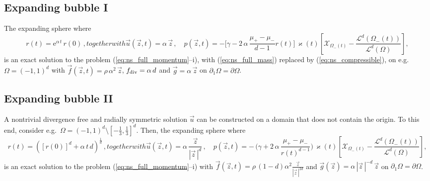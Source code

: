 \documentclass[a4paper,12pt,onecolumn]{article}
\newcommand{\vol}{\mathcal{L}^d}
\newcommand{\bigchi}{\ensuremath{\mathrm{\mathcal{X}}}}
\newcommand{\charfcn}[1]{\bigchi_{#1}} %
\begin{document}
\subsection{Expanding bubble I}\label{sec:exp1}
The expanding sphere where
\begin{subequations}
\begin{equation} \label{eq:ns_sol_1_r}
r(t) = \mathrm{e}^{\alpha\,t}\,r(0)\,,
\end{equation}
together with
\begin{equation} \label{eq:ns_sol_1_up}
\vec u(\vec z, t) = \alpha\,\vec z \,, \quad
p(\vec z, t) = -\bigg[\gamma - 2\,\alpha\,\frac{\mu_+ - \mu_-}
{d-1}r(t)\bigg]\,\varkappa(t)\left[ \charfcn{\Omega_-(t)} -
\frac{\vol(\Omega_-(t))}{\vol(\Omega)}\right],
\end{equation}
\end{subequations}
is an exact solution to the problem (\ref{eq:ns_full_momentum}--i), with
(\ref{eq:ns_full_mass}) replaced by (\ref{eq:ns_compressible}), on
e.g.\ $\Omega = (-1,1)^d$  with $\vec f(\vec z, t) = \rho\,\alpha^2\,\vec z$,
$f_{\rm{div}} = \alpha\,d$ and $\vec g = \alpha\,\vec z$ on
$\partial_1\Omega=\partial\Omega$.

\subsection{Expanding bubble II}\label{sec:exp2}
A nontrivial divergence free and radially symmetric solution $\vec u$
can be constructed on a domain that does not contain the origin. To this end,
consider e.g.\ $\Omega = (-1,1)^d \setminus [-\frac13, \frac13]^d$. Then, the
expanding sphere where
\begin{subequations}
\begin{equation} \label{eq:ns_sol_3_r}
r(t) = ([r(0)]^d + \alpha\,t\,d)^\frac1d \,,
\end{equation}
together with
\begin{equation} \label{eq:ns_sol_3_up}
\vec u(\vec z, t) = \alpha\,\frac{\vec z}{|\vec z\,|^d}\,, \quad
p(\vec z, t) = -\,\bigg(\gamma +2\,\alpha\,\frac{\mu_+ - \mu_-}
{r(t)^{d-1}}\bigg)\,\varkappa(t)\left[ \charfcn{\Omega_-(t)} -
\frac{\vol(\Omega_-(t))}{\vol(\Omega)}\right],
\end{equation}
\end{subequations}
is an exact solution to the problem (\ref{eq:ns_full_momentum}--i) with
$\vec f(\vec z, t) = \rho\,(1-d)\alpha^2\frac{\vec z}{|\vec z\,|^{2d}}$ and
$\vec g(\vec z) = \alpha\,|\vec z\,|^{-d}\,\vec z$ on
$\partial_1\Omega=\partial\Omega$.
\end{document}
